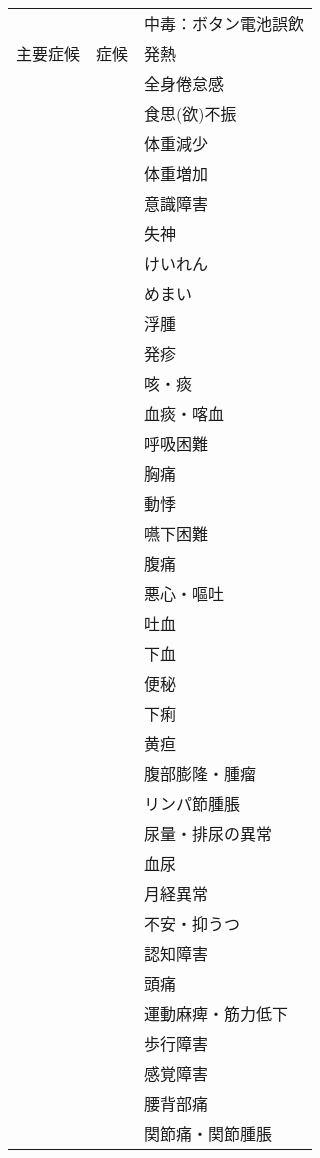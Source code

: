 \begin{xltabular}{\linewidth}{XXX}
 &  & 中毒：ボタン電池誤飲  \\
主要症候 & 症候 & 発熱 \\
 &  & 全身倦怠感 \\
 &  & 食思(欲)不振 \\
 &  & 体重減少 \\
 &  & 体重増加 \\
 &  & 意識障害 \\
 &  & 失神 \\
 &  & けいれん \\
 &  & めまい \\
 &  & 浮腫 \\
 &  & 発疹 \\
 &  & 咳・痰 \\
 &  & 血痰・喀血 \\
 &  & 呼吸困難 \\
 &  & 胸痛 \\
 &  & 動悸 \\
 &  & 嚥下困難 \\
 &  & 腹痛 \\
 &  & 悪心・嘔吐 \\
 &  & 吐血 \\
 &  & 下血 \\
 &  & 便秘 \\
 &  & 下痢 \\
 &  & 黄疸 \\
 &  & 腹部膨隆・腫瘤 \\
 &  & リンパ節腫脹 \\
 &  & 尿量・排尿の異常 \\
 &  & 血尿 \\
 &  & 月経異常 \\
 &  & 不安・抑うつ \\
 &  & 認知障害 \\
 &  & 頭痛 \\
 &  & 運動麻痺・筋力低下 \\
 &  & 歩行障害 \\
 &  & 感覚障害 \\
 &  & 腰背部痛 \\
 &  & 関節痛・関節腫脹 \\
\bottomrule
\end{xltabular}

